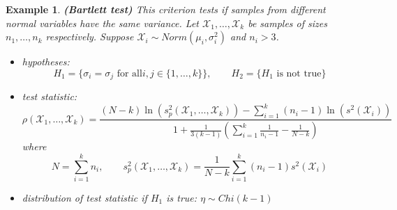 \documentclass[12pt]{article}
\newtheorem{example}[theorem]{Example}
\begin{document}
\begin{example} \textbf{(Bartlett test)} This criterion tests if samples from
    different normal variables have the same variance. Let
    $\mathscr{X}_1,\ldots,\mathscr{X}_k$ be samples of sizes $n_1,\ldots,n_k$
    respectively. Suppose $\mathscr{X}_i\sim Norm(\mu_i,\sigma_i^2)$ and
    $n_i>3$.
    \begin{itemize}
        \item hypotheses:
              $$
                  H_1=\{\sigma_i=\sigma_j
                  \mbox{ for all}i,j\in \{1,\ldots,k\} \},
                  \quad\quad H_2=\{H_1\mbox{ is not true}\}
              $$
        \item test statistic:
              $$
                  \rho(\mathscr{X}_1,\ldots,\mathscr{X}_k)
                  =\frac{
                      (N-k)\ln(s_p^2(\mathscr{X}_1,\ldots,\mathscr{X}_k))
                      -\sum_{i=1}^k (n_i-1)\ln(s^2(\mathscr{X}_i))
                  }{
                      1+\frac{1}{3(k-1)}
                      \left(\sum_{i=1}^k \frac{1}{n_i-1}-\frac{1}{N-k}\right)
                  }
              $$
              where
              $$
                  N=\sum_{i=1}^k n_i,
                  \quad\quad
                  s_p^2(\mathscr{X}_1,\ldots,\mathscr{X}_k)
                  =\frac{1}{N-k}\sum_{i=1}^k (n_i-1) s^2(\mathscr{X}_i)
              $$
        \item distribution of test statistic if $H_1$ is true: $\eta\sim
                  Chi(k-1)$
    \end{itemize}
\end{example}
\end{document}
